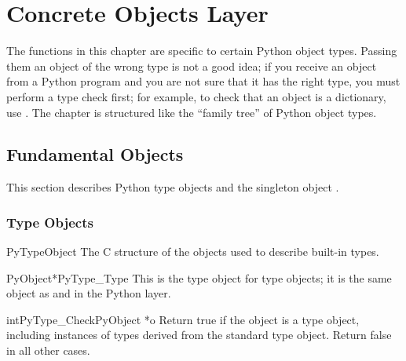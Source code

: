 \chapter{Concrete Objects Layer \label{concrete}}


The functions in this chapter are specific to certain Python object
types.  Passing them an object of the wrong type is not a good idea;
if you receive an object from a Python program and you are not sure
that it has the right type, you must perform a type check first;
for example, to check that an object is a dictionary, use
.  The chapter is structured like the
``family tree'' of Python object types.



\section{Fundamental Objects \label{fundamental}}

This section describes Python type objects and the singleton object
.


\subsection{Type Objects \label{typeObjects}}

\begin{ctypedesc}{PyTypeObject}
  The C structure of the objects used to describe built-in types.
\end{ctypedesc}

\begin{cvardesc}{PyObject*}{PyType_Type}
  This is the type object for type objects; it is the same object as
   and  in the Python layer.
\end{cvardesc}

\begin{cfuncdesc}{int}{PyType_Check}{PyObject *o}
  Return true if the object  is a type object, including
  instances of types derived from the standard type object.  Return
  false in all other cases.
\end{cfuncdesc}

